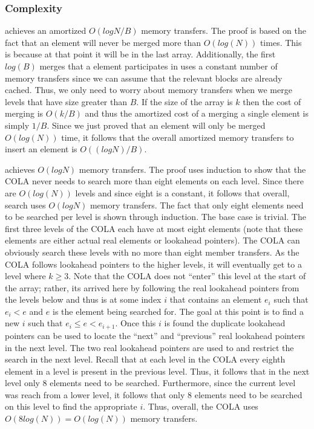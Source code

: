 \documentclass{style}
\begin{document}
\subsubsection{Complexity}

\Insert{} achieves an amortized $O(log N / B)$ memory transfers. The proof is
based on the fact that an element will never be merged more than $O(log(N))$
times. This is because at that point it will be in the last array.
Additionally, the first $log(B)$ merges that a element participates in uses a
constant number of memory transfers since we can assume that the relevant
blocks are already cached. Thus, we only need to worry about memory transfers
when we merge levels that have size greater than $B$. If the size of the array
is $k$ then the cost of merging is $O(k/B)$ and thus the amortized cost of a
merging a single element is simply $1/B$. Since we just proved that an element
will only be merged $O(log(N))$ time, it follows that the overall amortized
memory transfers to insert an element is $O((log N)/B)$.

\Search{} achieves $O(log N)$ memory transfers. The proof uses induction to
show that the COLA never needs to search more than eight elements on each
level. Since there are $O(log(N))$ levels and since eight is a constant, it
follows that overall, search uses $O(log N)$ memory transfers. The fact that
only eight elements need to be searched per level is shown through induction.
The base case is trivial. The first three levels of the COLA each have at most
eight elements (note that these elements are either actual real elements or
lookahead pointers). The COLA can obviously search these levels with no more
than eight member transfers. As the COLA follows lookahead pointers to the
higher levels, it will eventually get to a level where $k \geq 3$. Note that the
COLA does not ``enter'' this level at the start of the array; rather, its
arrived here by following the real lookahead pointers from the levels below
and thus is at some index $i$ that contains an element $e_i$ such that $e_i <
e$ and $e$ is the element being searched for. The goal at this point is to
find a new $i$ such that $e_i \leq e < e_{i+1}$. Once this $i$ is found the
duplicate lookahead pointers can be used to locate the ``next'' and
``previous'' real lookahead pointers in the next level. The two real lookahead
pointers are used to and restrict the search in the next level. Recall that at
each level in the COLA every eighth element in a level is present in the
previous level. Thus, it follows that in the next level only 8 elements need to be
searched. Furthermore, since the current level was reach from a lower level,
it follows that only 8 elements need to be searched on this level to find the
appropriate $i$. Thus, overall, the COLA uses $O(8log(N)) = O(log(N))$ memory
transfers.
\end{document}
